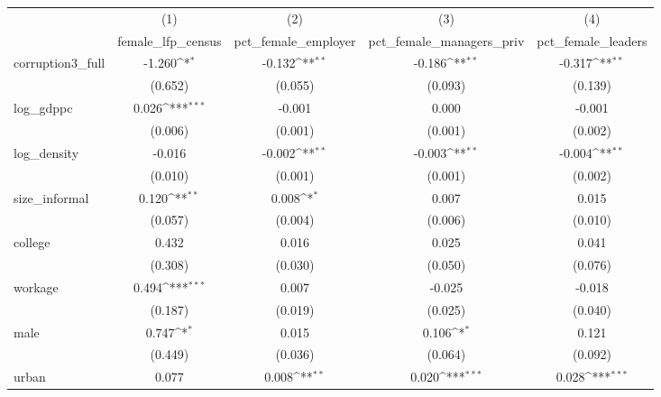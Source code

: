 {
\def\sym#1{\ifmmode^{#1}\else\(^{#1}\)\fi}
\begin{tabular}{l*{4}{c}}
\hline\hline
            &\multicolumn{1}{c}{(1)}&\multicolumn{1}{c}{(2)}&\multicolumn{1}{c}{(3)}&\multicolumn{1}{c}{(4)}\\
            &\multicolumn{1}{c}{female\_lfp\_census}&\multicolumn{1}{c}{pct\_female\_employer}&\multicolumn{1}{c}{pct\_female\_managers\_priv}&\multicolumn{1}{c}{pct\_female\_leaders}\\
\hline
corruption3\_full&      -1.260\sym{*}  &      -0.132\sym{**} &      -0.186\sym{**} &      -0.317\sym{**} \\
            &     (0.652)         &     (0.055)         &     (0.093)         &     (0.139)         \\
[1em]
log\_gdppc   &       0.026\sym{***}&      -0.001         &       0.000         &      -0.001         \\
            &     (0.006)         &     (0.001)         &     (0.001)         &     (0.002)         \\
[1em]
log\_density &      -0.016         &      -0.002\sym{**} &      -0.003\sym{**} &      -0.004\sym{**} \\
            &     (0.010)         &     (0.001)         &     (0.001)         &     (0.002)         \\
[1em]
size\_informal&       0.120\sym{**} &       0.008\sym{*}  &       0.007         &       0.015         \\
            &     (0.057)         &     (0.004)         &     (0.006)         &     (0.010)         \\
[1em]
college     &       0.432         &       0.016         &       0.025         &       0.041         \\
            &     (0.308)         &     (0.030)         &     (0.050)         &     (0.076)         \\
[1em]
workage     &       0.494\sym{***}&       0.007         &      -0.025         &      -0.018         \\
            &     (0.187)         &     (0.019)         &     (0.025)         &     (0.040)         \\
[1em]
male        &       0.747\sym{*}  &       0.015         &       0.106\sym{*}  &       0.121         \\
            &     (0.449)         &     (0.036)         &     (0.064)         &     (0.092)         \\
[1em]
urban       &       0.077         &       0.008\sym{**} &       0.020\sym{***}&       0.028\sym{***}\\

\end{tabular}}
